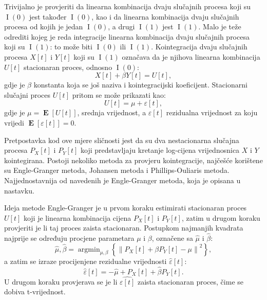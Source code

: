 \documentclass[lmodern, utf8, diplomski, numeric]{fer}
\newcommand{\E}[1]{\operatorname{\mathbf{E}}\left[#1\right]}
\newcommand{\I}[1]{\operatorname{\mathrm{I}}\left(#1\right)}
\DeclareMathOperator*{\argmin}{arg\min}
\begin{document}
  Trivijalno je provjeriti da linearna kombinacija dvaju slučajnih procesa koji su $\I{0}$ jest također $\I{0}$, kao i da linearna kombinacija dvaju slučajnih procesa od kojih je jedan $\I{0}$, a drugi $\I{1}$ jest $\I{1}$.
  Malo je teže odrediti kojeg je reda integracije linearna kombinacija dvaju slučajnih procesa koji su $\I{1}$: to može biti $\I{0}$ ili $\I{1}$.
  Kointegracija dvaju slučajnih procesa $X\left[t\right]$ i $Y\left[t\right]$ koji su $\I{1}$ označava da je njihova linearna kombinacija $U\left[t\right]$ stacionaran proces, odnosno $\I{0}$:
  \begin{equation}
  X\left[t\right] + \beta Y\left[t\right] = U\left[t\right],
  \end{equation}
  gdje je $\beta$ konstanta koja se još naziva i kointegracijski koeficijent.
  Stacionarni slučajni proces $U\left[t\right]$ pritom se može prikazati kao:
  \begin{equation}
  U\left[t\right] = \mu + \varepsilon\left[t\right],
  \end{equation}
  gdje je $\mu = \E{U\left[t\right]}$, srednja vrijednost, a $\varepsilon\left[t\right]$ rezidualna vrijednost za koju vrijedi $\E{\varepsilon\left[t\right]} = 0$.
  
  Pretpostavka kod ove mjere sličnosti jest da su dva nestacionarna slučajna procesa $P_X\left[t\right]$ i $P_Y\left[t\right]$ koji predstavljaju kretanje log-cijena vrijednosnica $X$ i $Y$ kointegirana.
  Postoji nekoliko metoda za provjeru kointegracije, najčešće korištene su Engle-Granger metoda, Johansen metoda i Phillips-Ouliaris metoda.
  Najjednostavnija od navedenih je Engle-Granger metoda, koja je opisana u nastavku.
  
  Ideja metode Engle-Granger je u prvom koraku estimirati stacionaran proces $U\left[t\right]$ koji je linearna kombinacija cijena $P_X\left[t\right]$ i $P_Y\left[t\right]$, zatim u drugom koraku provjeriti je li taj proces zaista stacionaran.
  Postupkom najmanjih kvadrata najprije se određuju procjene parametara $\mu$ i $\beta$, označene sa $\hat{\mu}$ i $\hat{\beta}$:
  \begin{equation}
  \hat{\mu}, \hat{\beta} = \argmin_{\mu, \beta} \left\{\left\lVert P_X\left[t\right] + \beta P_Y\left[t\right] -\mu \right\rVert^2\right\},
  \end{equation}
  a zatim se izraze procijenjene rezidualne vrijednosti $\hat{\varepsilon}\left[t\right]$:
  \begin{equation}
  \hat{\varepsilon}\left[t\right] = -\hat{\mu} + P_X\left[t\right] + \hat{\beta} P_Y\left[t\right].
  \end{equation}
  U drugom koraku provjerava se je li $\hat{\varepsilon\left[t\right]}$ zaista stacionaran proces, čime se dobiva t-vrijednost.
  
\end{document}
